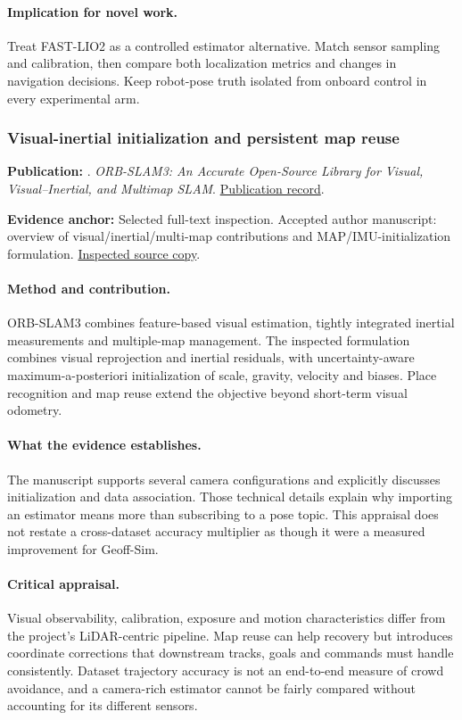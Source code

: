 \paragraph{Implication for novel work.} Treat FAST-LIO2 as a controlled estimator alternative. Match sensor sampling and calibration, then compare both localization metrics and changes in navigation decisions. Keep robot-pose truth isolated from onboard control in every experimental arm.

\subsubsection{Visual-inertial initialization and persistent map reuse}\label{paper:orbslam}
\textbf{Publication:} \citet{orbslam}. \emph{ORB-SLAM3: An Accurate Open-Source Library for Visual, Visual–Inertial, and Multimap SLAM}. \href{https://doi.org/10.1109/tro.2021.3075644}{Publication record}.

\textbf{Evidence anchor:} Selected full-text inspection. Accepted author manuscript: overview of visual/inertial/multi-map contributions and MAP/IMU-initialization formulation. \href{https://arxiv.org/pdf/2007.11898}{Inspected source copy}.

\paragraph{Method and contribution.} ORB-SLAM3 combines feature-based visual estimation, tightly integrated inertial measurements and multiple-map management. The inspected formulation combines visual reprojection and inertial residuals, with uncertainty-aware maximum-a-posteriori initialization of scale, gravity, velocity and biases. Place recognition and map reuse extend the objective beyond short-term visual odometry.

\paragraph{What the evidence establishes.} The manuscript supports several camera configurations and explicitly discusses initialization and data association. Those technical details explain why importing an estimator means more than subscribing to a pose topic. This appraisal does not restate a cross-dataset accuracy multiplier as though it were a measured improvement for Geoff-Sim.

\paragraph{Critical appraisal.} Visual observability, calibration, exposure and motion characteristics differ from the project's LiDAR-centric pipeline. Map reuse can help recovery but introduces coordinate corrections that downstream tracks, goals and commands must handle consistently. Dataset trajectory accuracy is not an end-to-end measure of crowd avoidance, and a camera-rich estimator cannot be fairly compared without accounting for its different sensors.

